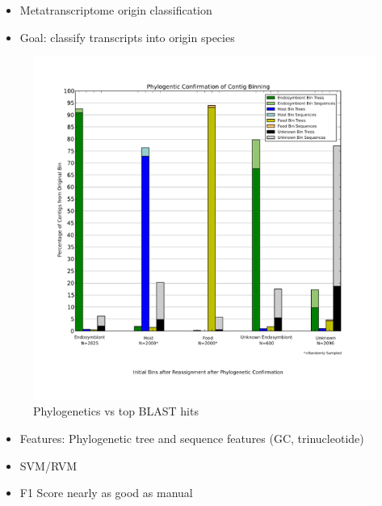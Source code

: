 \documentclass[ignorenonframetext,]{beamer}
\begin{document}
\begin{frame}

\begin{itemize}
\itemsep1pt\parskip0pt
\item
  Metatranscriptome origin classification
\item
  Goal: classify transcripts into origin species
\end{itemize}

\begin{figure}[htbp]
\centering
\includegraphics{assets/presentation/GIML/binning.png}
\caption{Phylogenetics vs top BLAST hits}
\end{figure}

\end{frame}

\begin{frame}

\begin{itemize}
\itemsep1pt\parskip0pt
\item
  Features: Phylogenetic tree and sequence features (GC, trinucleotide)
\item
  SVM/RVM
\item
  F1 Score nearly as good as manual
\end{itemize}

\end{frame}
\end{document}
